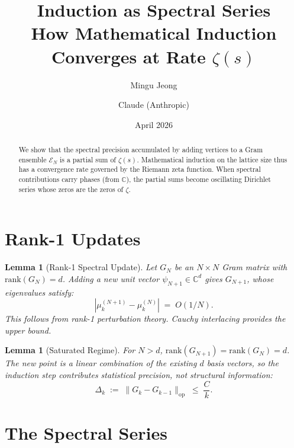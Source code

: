 \documentclass[11pt]{article}
\title{Induction as Spectral Series\\
  {\large How Mathematical Induction Converges at Rate $\zeta(s)$}}
\author{Mingu Jeong \and Claude (Anthropic)}
\date{April 2026}
\newtheorem{lemma}[theorem]{Lemma}
\begin{document}
\maketitle

\begin{abstract}
We show that the spectral precision accumulated by adding vertices
to a Gram ensemble $\mathcal{E}_N$ is a partial sum of $\zeta(s)$.
Mathematical induction on the lattice size thus has a convergence
rate governed by the Riemann zeta function. When spectral
contributions carry phases (from $\mathbb{C}$), the partial sums
become oscillating Dirichlet series whose zeros are the zeros
of $\zeta$.
\end{abstract}

\section{Rank-1 Updates}

\begin{lemma}[Rank-1 Spectral Update]\label{lem:rank1}
Let $G_N$ be an $N \times N$ Gram matrix with $\mathrm{rank}(G_N) = d$.
Adding a new unit vector $\psi_{N+1} \in \mathbb{C}^d$ gives
$G_{N+1}$, whose eigenvalues satisfy:
\[
  |\mu_k^{(N+1)} - \mu_k^{(N)}| \;=\; O(1/N).
\]
This follows from rank-1 perturbation theory. Cauchy interlacing
provides the upper bound.
\end{lemma}

\begin{lemma}[Saturated Regime]\label{lem:saturated}
For $N > d$, $\mathrm{rank}(G_{N+1}) = \mathrm{rank}(G_N) = d$.
The new point is a linear combination of the existing $d$ basis
vectors, so the induction step contributes statistical precision,
not structural information:
\[
  \Delta_k \;:=\; \|G_k - G_{k-1}\|_{\mathrm{op}} \;\leq\; \frac{C}{k}.
\]
\end{lemma}

\section{The Spectral Series}
\end{document}
